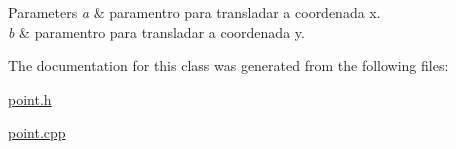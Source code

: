 \begin{DoxyParams}{Parameters}
{\em a} & paramentro para transladar a coordenada x. \\
\hline
{\em b} & paramentro para transladar a coordenada y. \\
\hline
\end{DoxyParams}


The documentation for this class was generated from the following files\+:\begin{DoxyCompactItemize}
\item 
\mbox{\hyperlink{point_8h}{point.\+h}}\item 
\mbox{\hyperlink{point_8cpp}{point.\+cpp}}\end{DoxyCompactItemize}
